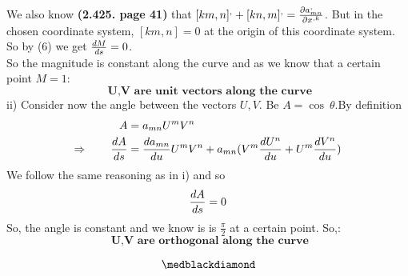 We also know \textbf{(2.425. page 41)} that $[km,n]^, + [kn,m]^, = \pdv{a^,_{mn}}{x^{,k}}$. But in the chosen coordinate system, $[km,n] = 0$ at the origin of this coordinate system. So by (6) we get $\dv{M}{s} = 0$.\\
So the magnitude is constant along the curve and as we know that a certain point $M =1$:\\
$$\textbf{ U,V are unit vectors along the curve}$$\newpage
ii) Consider now the angle between the vectors $U,V$. Be $A = \cos \ \theta$.By definition 
\begin{align}
\ A &= a_{mn}U ^mV^n\\
\Rightarrow \quad\quad \dv{A}{s} &= \dv{a_{mn}}{u}U^m V^n + a_{mn}(V^m \dv{U^n}{u} +U^m \dv{V^n}{u} )
\end{align}
We follow the same reasoning as in i) and so
$$\dv{A}{s} = 0$$
So, the angle is constant and we know is is $\frac{\pi}{2}$ at a certain point. So,:
$$\textbf{ U,V are orthogonal along the curve}$$

$$\medblackdiamond$$
\newpage

